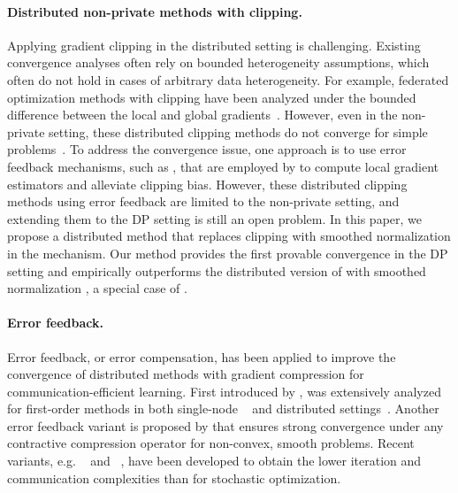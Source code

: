\paragraph{Distributed non-private methods with clipping.}
Applying gradient clipping in the distributed setting is challenging.
Existing convergence analyses often rely on bounded heterogeneity assumptions, which often do not hold in cases of arbitrary data heterogeneity.
For example, federated optimization methods with clipping have been analyzed under the bounded difference between the local and global gradients~\citep{wei2020federated,liu2022communication,crawshaw2023episode,li2024an}.
However, even in the non-private setting, these distributed clipping methods do not converge for simple problems~\citep{chen2020understanding,khirirat2023clip21}. 
To address the convergence issue, one approach is to use error feedback mechanisms, such as  \citep{richtarik2021ef21}, that are employed by \citet{khirirat2023clip21,yu2023smoothed} to compute local gradient estimators and alleviate clipping bias. However, these distributed clipping methods using error feedback are limited to the non-private setting, and extending them to the DP setting is still an open problem.
In this paper, we propose a distributed method that replaces clipping with smoothed normalization in the  mechanism. 
Our method provides the first provable convergence in the DP setting and empirically outperforms the distributed version of  with smoothed normalization \citet{bu2024automatic, yang2022normalized}, a special case of \citet{das2021convergence}.


\paragraph{Error feedback.} 
Error feedback, or error compensation, has been applied to improve the convergence of distributed methods with gradient compression for communication-efficient learning.
First introduced by \citet{seide20141},  was extensively analyzed for first-order methods  in both single-node ~\citep{stich2018sparsified,karimireddy2019error,stich2019error,khirirat2019convergence} and distributed settings~\citep{wu2018error,alistarh2018convergence,gorbunov2020linearly,qian2021error,tang2019doublesqueeze,danilova2022distributed,qian2023catalyst}. 
Another error feedback variant is   proposed by \citet{richtarik2021ef21} that ensures strong convergence under any contractive compression operator for non-convex, smooth problems.  
Recent variants, e.g. ~\citep{fatkhullin2024momentum}  and ~\citep{gao2023econtrol},  have been developed to obtain the lower iteration and communication complexities than  for stochastic optimization.